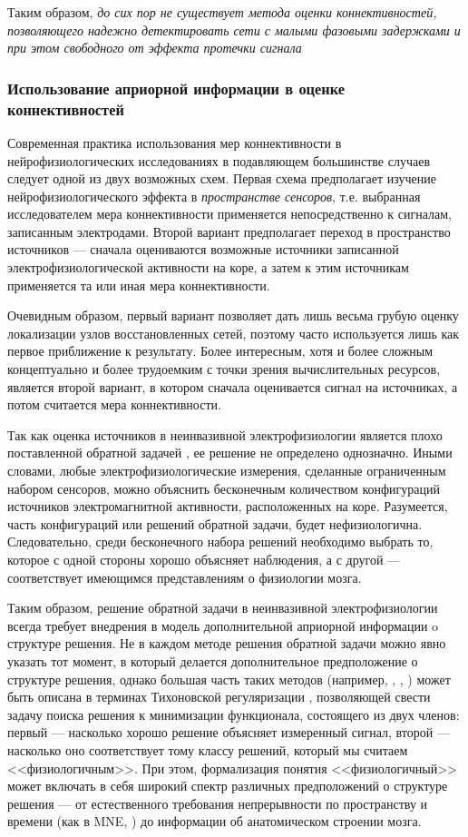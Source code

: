 Таким образом, \emph{до сих пор не существует метода оценки коннективностей,
позволяющего надежно детектировать сети с малыми фазовыми задержками и при этом свободного
от эффекта протечки сигнала}


\subsubsection*{Использование априорной информации в оценке коннективностей}

Современная практика использования мер коннективности в нейрофизиологических
исследованиях в подавляющем большинстве случаев следует одной из двух возможных схем.
Первая схема предполагает изучение нейрофизиологического эффекта  в \emph{пространстве сенсоров},
т.е. выбранная исследователем мера коннективности применяется непосредственно к сигналам,
записанным электродами.
Второй вариант предполагает переход в пространство источников --- сначала оцениваются
возможные источники записанной электрофизиологической активности на коре, а затем к этим
источникам применяется та или иная  мера коннективности.

Очевидным образом, первый вариант позволяет дать лишь весьма грубую оценку локализации
узлов восстановленных сетей, поэтому часто используется лишь как первое приближение к результату.
Более интересным, хотя и более сложным концептуально и более
трудоемким с точки зрения вычислительных ресурсов, является второй вариант, в котором
сначала оценивается сигнал на источниках, а потом считается мера коннективности.

Так как оценка источников в неинвазивной электрофизиологии является
плохо поставленной обратной задачей ,
ее решение не определено однозначно. Иными словами, любые электрофизиологические измерения,
сделанные ограниченным набором сенсоров, можно объяснить бесконечным количеством конфигураций
источников электромагнитной активности, расположенных на коре. Разумеется, часть конфигураций
или решений обратной задачи, будет нефизиологична. Следовательно, среди бесконечного набора
решений необходимо выбрать то, которое с одной стороны хорошо объясняет наблюдения, а с другой ---
соответствует имеющимся представлениям о физиологии мозга.

Таким образом, решение обратной задачи в неинвазивной электрофизиологии всегда требует внедрения
в модель дополнительной априорной информации o структуре решения. Не в каждом методе
решения обратной задачи можно явно указать тот момент, в который делается дополнительное
предположение о структуре решения, однако большая часть таких методов
(например, \cite{mne}, \cite{min_current}, \cite{loreta})
может быть описана в терминах Тихоновской регуляризации \cite{tikhonov}, позволяющей свести задачу поиска
решения к минимизации функционала, состоящего из двух членов: первый --- насколько хорошо
решение объясняет измеренный сигнал, второй --- насколько оно соответствует тому классу решений,
который мы считаем <<физиологичным>>. При этом, формализация понятия <<физиологичный>> может
включать в себя широкий спектр различных предположений о структуре решения
--- от естественного требования непрерывности по пространству и времени (как в MNE, \cite{mne}) до
информации об анатомическом строении мозга.

